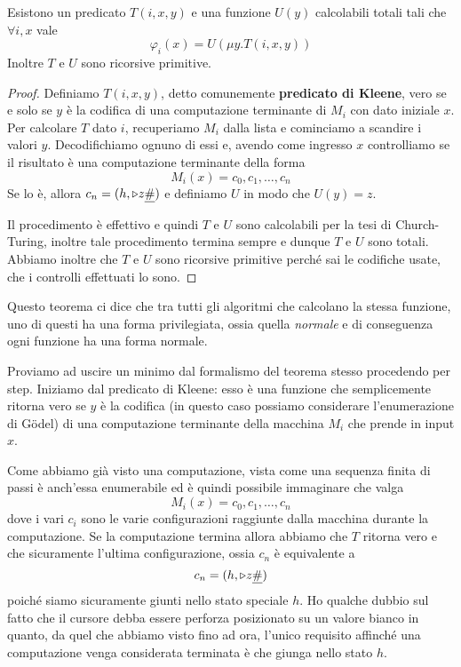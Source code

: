 \begin{theorem} \label{th: fn}
	Esistono un predicato $T(i, x, y)$ e una funzione $U(y)$
	calcolabili totali tali che $\forall i,x$ vale
	\[ \varphi_i(x) = U(\mu y . T (i, x, y)) \]
	Inoltre $T$ e $U$ sono ricorsive primitive.
	\begin{proof}
		Definiamo $T(i,x,y)$, detto comunemente
		\textbf{predicato di Kleene}, vero se e solo se $y$ è
		la codifica di una computazione terminante di $M_i$
		con dato iniziale $x$. Per calcolare $T$ dato $i$,
		recuperiamo $M_i$ dalla lista e cominciamo a scandire
		i valori $y$. Decodifichiamo ognuno di essi e, avendo
		come ingresso $x$ controlliamo se il risultato è una
		computazione terminante della forma
		\[ M_i(x) = c_0, c_1, \dots, c_n \]
		Se lo è, allora $c_n = (h, \triangleright z \underline{\#})$ e
		definiamo $U$ in modo che $U(y) = z$.

		Il procedimento è effettivo e quindi $T$ e $U$ sono
		calcolabili per la tesi di Church-Turing, inoltre tale
		procedimento termina sempre e dunque $T$ e $U$ sono
		totali. Abbiamo inoltre che $T$ e $U$ sono ricorsive
		primitive perché sai le codifiche usate, che i controlli
		effettuati lo sono.
	\end{proof}
\end{theorem}

Questo teorema ci dice che tra tutti gli algoritmi che calcolano
la stessa funzione, uno di questi ha una forma privilegiata,
ossia quella \emph{normale} e di conseguenza ogni funzione ha
una forma normale.

Proviamo ad uscire un minimo dal formalismo del teorema stesso
procedendo per step. Iniziamo dal predicato di Kleene: esso è
una funzione che semplicemente ritorna vero se $y$ è la codifica
(in questo caso possiamo considerare l'enumerazione di G\"odel)
di una computazione terminante della macchina $M_i$ che prende
in input $x$.

Come abbiamo già visto una computazione, vista come una sequenza
finita di passi è anch'essa enumerabile ed è quindi possibile
immaginare che valga
\[ M_i (x) = c_0, c_1, \dots, c_n \]
dove i vari $c_i$ sono le varie configurazioni raggiunte dalla
macchina durante la computazione. Se la computazione termina
allora abbiamo che $T$ ritorna vero e che sicuramente l'ultima
configurazione, ossia $c_n$ è equivalente a
\[ c_n = (h, \triangleright z \underline{\#}) \]
poiché siamo sicuramente giunti nello stato speciale $h$. Ho
qualche dubbio sul fatto che il cursore debba essere perforza
posizionato su un valore bianco in quanto, da quel che abbiamo
visto fino ad ora, l'unico requisito affinché una computazione
venga considerata terminata è che giunga nello stato $h$.

